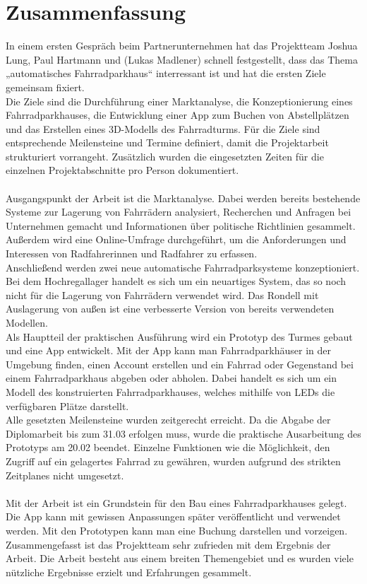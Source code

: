 \section{Zusammenfassung}

In einem ersten Gespräch beim Partnerunternehmen hat das Projektteam Joshua Lung, Paul Hartmann und (Lukas Madlener) schnell festgestellt, dass das Thema „automatisches Fahrradparkhaus“ interressant ist und hat die ersten Ziele gemeinsam fixiert. \\
Die Ziele sind die Durchführung einer Marktanalyse, die Konzeptionierung eines Fahrradparkhauses, die Entwicklung einer App zum Buchen von Abstellplätzen und das Erstellen eines 3D-Modells des Fahrradturms. Für die Ziele sind entsprechende Meilensteine und Termine definiert, damit die Projektarbeit strukturiert vorrangeht. Zusätzlich wurden die eingesetzten Zeiten für die einzelnen Projektabschnitte pro Person dokumentiert.\\ \\
Ausgangspunkt der Arbeit ist die Marktanalyse. Dabei werden bereits bestehende Systeme zur Lagerung von Fahrrädern analysiert, Recherchen und Anfragen bei Unternehmen gemacht und Informationen über politische Richtlinien gesammelt. Außerdem wird eine Online-Umfrage durchgeführt, um die Anforderungen und Interessen von Radfahrerinnen und Radfahrer zu erfassen.\\
Anschließend werden zwei neue automatische Fahrradparksysteme konzeptioniert. Bei dem Hochregallager handelt es sich um ein neuartiges System, das so noch nicht für die Lagerung von Fahrrädern verwendet wird. Das Rondell mit Auslagerung von außen ist eine verbesserte Version von bereits verwendeten Modellen.\\
Als Hauptteil der praktischen Ausführung wird ein Prototyp des Turmes gebaut und eine App entwickelt. Mit der App kann man Fahrradparkhäuser in der Umgebung finden, einen Account erstellen und ein Fahrrad oder Gegenstand bei einem Fahrradparkhaus abgeben oder abholen. Dabei handelt es sich um ein Modell des konstruierten Fahrradparkhauses, welches mithilfe von LEDs die verfügbaren Plätze darstellt. \\
Alle gesetzten Meilensteine wurden zeitgerecht erreicht. Da die Abgabe der Diplomarbeit bis zum 31.03 erfolgen muss, wurde die praktische Ausarbeitung des Prototyps am 20.02 beendet. Einzelne Funktionen wie die Möglichkeit, den Zugriff auf ein gelagertes Fahrrad zu gewähren, wurden aufgrund des strikten Zeitplanes nicht umgesetzt.\\ \\

Mit der Arbeit ist ein Grundstein für den Bau eines Fahrradparkhauses gelegt. Die App kann mit gewissen Anpassungen später veröffentlicht und verwendet werden. Mit den Prototypen kann man eine Buchung darstellen und vorzeigen.\\
Zusammengefasst ist das Projektteam sehr zufrieden mit dem Ergebnis der Arbeit. Die Arbeit besteht aus einem breiten Themengebiet und es wurden viele nützliche Ergebnisse erzielt und Erfahrungen gesammelt.\\

